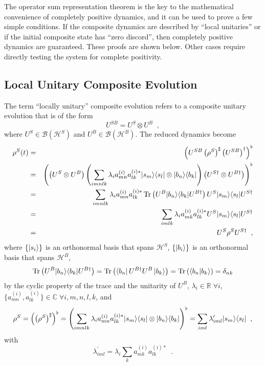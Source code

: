 The operator sum representation theorem is the key to the mathematical convenience of completely positive dynamics, and it can be used to prove a few simple conditions.  If the composite dynamics are described by ``local unitaries'' or if the initial composite state has ``zero discord'', then completely positive dynamics are guaranteed.  These proofs are shown below.  Other cases require directly testing the system for complete positivity.

\subsection{Local Unitary Composite Evolution}

The term ``locally unitary'' composite evolution refers to a composite unitary evolution that is of the form
\begin{equation*}
U^{SB} = U^S \otimes U^B\;\;,
\end{equation*}
where $U^S\in\mathcal{B}(\mathcal{H}^S)$ and $U^B\in\mathcal{B}(\mathcal{H}^B)$.  The reduced dynamics become
\begin{eqnarray*}
\rho^S(t) &=& \left(U^{SB}\left(\rho^{S}\right)^\sharp\left(U^{SB}\right)^\dagger\right)^\flat\\
&=&\left(\left(U^S\otimes U^B\right)\left(\sum_{imnlk} \lambda_i a_{mn}^{(i)} a_{lk}^{(i)*}|s_m\rangle\langle s_l|\otimes |b_n\rangle\langle b_k|\right)\left(U^{S\dagger}\otimes U^{B\dagger}\right)\right)^\flat\\
&=& \sum_{imnlk} \lambda_i a_{mn}^{(i)} a_{lk}^{(i)*} \operatorname{Tr}\left(U^B|b_n\rangle\langle b_k| U^{B\dagger}\right) U^S|s_m\rangle\langle s_l| U^{S\dagger}\\
&=& \sum_{imlk} \lambda_i a_{mk}^{(i)} a_{lk}^{(i)*} U^S|s_m\rangle\langle s_l| U^{S\dagger}\\
&=& U^S \rho^S U^{S\dagger}\;\;,
\end{eqnarray*}
where $\{\left|s_i\right\rangle\}$ is an orthonormal basis that spans $\mathcal{H}^S$, $\{\left|b_i\right\rangle\}$ is an orthonormal basis that spans $\mathcal{H}^B$, 
$$
\operatorname{Tr}\left(U^B |b_n\rangle\langle b_k| U^{B\dagger}\right) = \operatorname{Tr}\left(\left\langle b_n\right|U^{B\dagger}U^B \left|b_k\right\rangle\right) = \operatorname{Tr}\left(\langle b_n|b_k\rangle\right) = \delta_{nk}
$$
by the cyclic property of the trace and the unitarity of $U^B$, $\lambda_i\in\mathbb{R}\;\forall i$, $\{a_{mn}^{(i)},a_{lk}^{(i)}\}\in\mathbb{C}\;\forall i,m,n,l,k$, and
$$
\rho^S=\left(\left(\rho^{S}\right)^\sharp\right)^\flat=\left(\sum_{imnlk} \lambda_i a_{mn}^{(i)} a_{lk}^{(i)*}|s_m\rangle\langle s_l|\otimes |b_n\rangle\langle b_k|\right)^\flat=\sum_{iml} \lambda_{iml}^\prime |s_m\rangle\langle s_l|\;\;,
$$
with
$$
\lambda_{iml}^\prime = \lambda_i \sum_k  a_{mk}^{(i)} a_{lk}^{(i)*}\;\;.
$$

